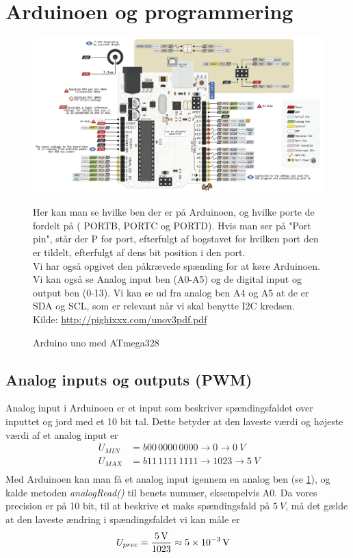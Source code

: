 \section{Arduinoen og programmering} \label{sec:arduino}
\begin{figure}[H]
	\centering
    \includegraphics[width=\textwidth]{figures/arduino/portmani.PNG}
	\caption{Arduino uno med ATmega328}
	\label{fig:portmani}
	Her kan man se hvilke ben der er på Arduinoen, og hvilke porte de fordelt på ( PORTB, PORTC og PORTD). Hvis man ser på "Port pin", står der P for port, efterfulgt af bogstavet for hvilken port den er tildelt, efterfulgt af dens bit position i den port.\\
	Vi har også opgivet den påkrævede spænding for at køre Arduinoen. Vi kan også se Analog input ben (A0-A5) og de digital input og output ben (0-13). Vi kan se ud fra analog ben A4 og A5 at de er SDA og SCL, som er relevant når vi skal benytte I2C kredsen.
	\\Kilde: \url{http://pighixxx.com/unov3pdf.pdf}
\end{figure}
\subsection{Analog inputs og outputs (PWM)}\label{sec:ard:analog}
Analog input i Arduinoen er et input som beskriver spændingsfaldet over inputtet og jord med et 10 bit tal.\cite{arduinoAnalog} Dette betyder at den laveste værdi og højeste værdi af et analog input er
\begin{align}
\SI{}{U_{MIN}}&=b00\,0000\,0000\rightarrow 0\rightarrow \SI{0}{V}\\
\SI{}{U_{MAX}}&=b11\,1111\,1111\rightarrow 1023\rightarrow \SI{5}{V}\\
\end{align}
Med Arduinoen kan man få et analog input igennem en analog ben (se \ref{fig:portmani}), og kalde metoden \emph{analogRead()} til benets nummer, eksempelvis A0. Da vores precision er på 10 bit, til at beskrive et maks spændingsfald på $\SI{5}{V}$, må det gælde at den laveste ændring i spændingsfaldet vi kan måle er
\begin{align}
U_{prec}&=\frac{\SI{5}{V}}{1023}\approx \SI{5d-3}{V}
\end{align}
